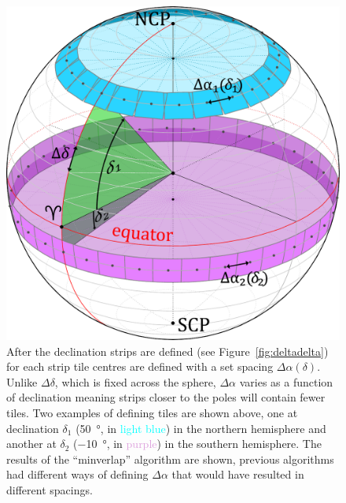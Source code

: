 \begin{colsection}
\begin{colsection}
\begin{figure}[p]
\begin{center}
\includegraphics[width=\linewidth]{images/globe3.pdf}
\end{center}
\caption[Defining the spacing between tiles]{After the declination strips are defined (see Figure~\ref{fig:deltadelta}) for each strip tile centres are defined with a set spacing $\Delta\alpha(\delta)$. Unlike $\Delta\delta$, which is fixed across the sphere, $\Delta\alpha$ varies as a function of declination meaning strips closer to the poles will contain fewer tiles. Two examples of defining tiles are shown above, one at declination $\delta_1$ (\SI{50}{\degree}, in \textcolor{cyan}{light blue}) in the northern hemisphere and another at $\delta_2$ (\SI{-10}{\degree}, in \textcolor{Plum}{purple}) in the southern hemisphere. The results of the ``minverlap'' algorithm are shown, previous algorithms had different ways of defining $\Delta\alpha$ that would have resulted in different spacings.
}
\label{fig:deltaalpha}
\end{figure}


\end{colsection}
\end{colsection}
